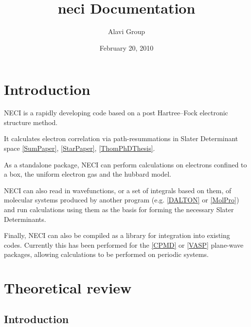 \documentclass[openany,a4paper,10pt,english]{manual}
\title{neci Documentation}
\date{February 20, 2010}
\author{Alavi Group}
\begin{document}
\maketitle
\tableofcontents
\hypertarget{--doc-index}{}


\resetcurrentobjects
\hypertarget{--doc-introduction}{}

\hypertarget{introduction}{}\chapter{Introduction}

NECI is a rapidly developing code based on a post Hartree--Fock electronic structure method.

It calculates electron correlation via path-resummations in Slater Determinant space \hyperlink{sumpaper}{{[}SumPaper{]}}, \hyperlink{starpaper}{{[}StarPaper{]}}, \hyperlink{thomphdthesis}{{[}ThomPhDThesis{]}}.

As a standalone package, NECI can perform calculations on electrons confined to a box, the uniform electron gas and the hubbard model.

NECI can also read in wavefunctions, or a set of integrals based on them, of molecular systems produced by another program (e.g. \hyperlink{dalton}{{[}DALTON{]}} or \hyperlink{molpro}{{[}MolPro{]}}) and run calculations using them as the basis for forming the necessary Slater Determinants.

Finally, NECI can also be compiled as a library for integration into existing codes.  Currently this has been performed for the \hyperlink{cpmd}{{[}CPMD{]}} or \hyperlink{vasp}{{[}VASP{]}} plane-wave packages, allowing calculations to be performed on periodic systems.

\resetcurrentobjects
\hypertarget{--doc-theory/index}{}

\hypertarget{theory-index}{}\chapter{Theoretical review}

\resetcurrentobjects
\hypertarget{--doc-theory/introduction}{}

\hypertarget{theory-introduction}{}\section{Introduction}
\end{document}
